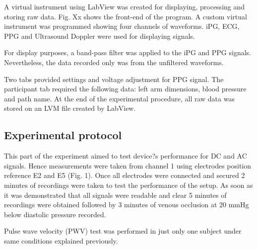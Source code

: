 A virtual instrument using LabView was created for displaying, processing and storing raw data. Fig. Xx shows the front-end of the program. A custom virtual instrument was programmed showing four channels of waveforms. iPG, ECG, PPG and Ultrasound Doppler were used for displaying signals.

For display purposes, a band-pass filter was applied to the iPG and PPG signals. Nevertheless, the data recorded only was from the unfiltered waveforms. 


Two tabs provided settings and voltage adjustment for PPG signal. The participant tab required the following data: left arm dimensions, blood pressure and path name. At the end of the experimental procedure, all raw data was stored on an LVM file created by LabView. 




\subsection{Experimental protocol}
\label{section4.1.3}

This part of the experiment aimed to test device?s performance for DC and AC signals. Hence measurements were taken from channel 1 using electrodes position reference E2 and E5 (Fig. 1). Once all electrodes were connected and secured 2 minutes of recordings were taken to test the performance of the setup. As soon as it was demonstrated that all signals were readable and clear 5 minutes of recordings were obtained followed by 3 minutes of venous occlusion at 20 mmHg below diastolic pressure recorded.

Pulse wave velocity (PWV) test was performed in just only one subject under same conditions explained previously. 




